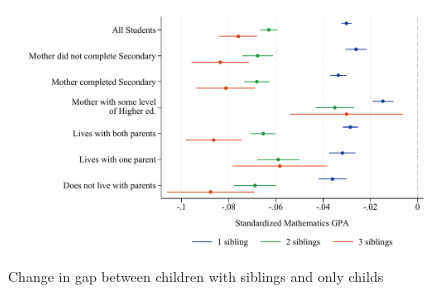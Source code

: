 \begin{figure}[htbp]
    \centering
    
        \includegraphics[width=\textwidth]{./FIGURES/TWFE/covid_twfe_D_bysibs_elm_all_gpa_m_adj_Tsiblings_Soldest_4.pdf}
        \caption{Change in gap between children with siblings and only childs}
        \label{fig:fig_appD}

\end{figure}


